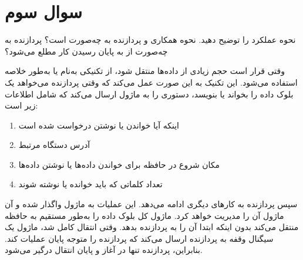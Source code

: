 \section{سوال سوم}

نحوه عملکرد  را توضیح دهید. نحوه همکاری  و پردازنده به چه‌صورت است؟ پردازنده به چه‌صورت از به پایان رسیدن کار  مطلع می‌شود؟


\begin{qsolve}
	وقتی قرار است حجم زیادی از داده‌ها منتقل شود، از تکنیکی به‌نام  یا به‌طور خلاصه  استفاده می‌شود. این تکنیک به این صورت عمل می‌کند که وقتی پردازنده می‌خواهد یک بلوک داده را بخواند یا بنویسد، دستوری را به ماژول  ارسال می‌کند که شامل اطلاعات زیر است:
	\begin{enumerate}
		\item 
		اینکه آیا خواندن یا نوشتن درخواست شده است 
		
		\item 
		آدرس دستگاه  مرتبط 
		
		\item 
		مکان شروع در حافظه برای خواندن داده‌ها یا نوشتن داده‌ها
		
		\item 
		تعداد کلماتی که باید خوانده یا نوشته شوند
		
	\end{enumerate}
	سپس پردازنده به کارهای دیگری ادامه می‌دهد. این عملیات  به ماژول  واگذار شده و آن ماژول آن را مدیریت خواهد کرد. ماژول  کل بلوک داده را به‌طور مستقیم به حافظه منتقل می‌کند بدون اینکه ابتدا آن را به پردازنده بدهد. وقتی انتقال کامل شد، ماژول  یک سیگنال وقفه به پردازنده ارسال می‌کند که پردازنده را متوجه پایان عملیات کند. بنابراین، پردازنده تنها در آغاز و پایان انتقال درگیر می‌شود.
	
\end{qsolve}
